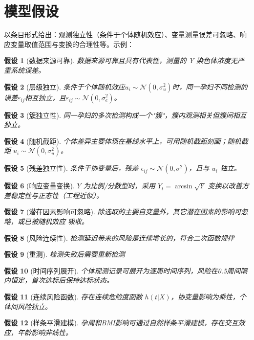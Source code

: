 \documentclass[12pt,a4paper]{ctexart}
\numberwithin{equation}{section}
\theoremstyle{mcm}
\newtheorem{assump}{假设}[section]
\begin{document}
\section{模型假设}
以条目形式给出：观测独立性（条件于个体随机效应）、变量测量误差可忽略、响应变量取值范围与变换的合理性等。示例：
\begin{assump}[数据来源可靠]
数据来源可靠且具有代表性，测量的 Y 染色体浓度无严重系统误差。
\end{assump}
\begin{assump}[层级独立]
条件于个体随机效应$u_i\sim\mathcal{N}(0,\sigma_u^2)$时，同一孕妇不同检测的误差$\varepsilon_{ij}$相互独立，且$\varepsilon_{ij}\sim\mathcal{N}(0,\sigma_e^2)$。
\end{assump}
\begin{assump}[簇独立性]
同一孕妇的多次检测构成一个"簇"，簇内观测相关但簇间相互独立。
\end{assump}
\begin{assump}[随机截距]
个体差异主要体现在基线水平上，可用随机截距刻画；随机截距 \( u_i \sim \mathcal{N}(0, \sigma_u^2) \)。
\end{assump}
\begin{assump}[残差独立性]
条件于协变量后，残差 \( \epsilon_{ij} \sim \mathcal{N}(0, \sigma^2) \)，且与 \( u_i \) 独立。
\end{assump}
\begin{assump}[响应变量变换]
\( Y \) 为比例/分数型时，采用 \( Y_t = \arcsin{\sqrt{Y}} \) 变换以改善方差稳定性与正态性（工程近似）。
\end{assump}
\begin{assump}[潜在因素影响可忽略]
除选取的主要自变量外，其它潜在因素的影响可忽略，或已被随机效应
吸收。
\end{assump}
\begin{assump}[风险连续性]
检测延迟带来的风险是连续增长的，符合二次函数规律
\end{assump}
\begin{assump}[重测]
检测失败后需要重新检测
\end{assump}
\begin{assump}[时间序列展开]
个体观测记录可展开为逐周时间序列，风险在0.5周间隔内恒定，首次达标后保持达标状态。
\end{assump}
\begin{assump}[连续风险函数]
存在连续危险度函数 \( h(t|X) \)，协变量影响为乘性，个体间风险独立。
\end{assump}
\begin{assump}[样条平滑建模]
孕周和BMI影响可通过自然样条平滑建模，存在交互效应，年龄影响非线性。
\end{assump}
\end{document}
